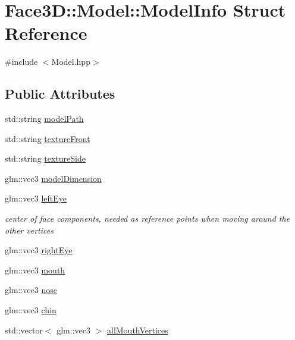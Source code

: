 \hypertarget{struct_face3_d_1_1_model_1_1_model_info}{}\section{Face3D\+:\+:Model\+:\+:Model\+Info Struct Reference}
\label{struct_face3_d_1_1_model_1_1_model_info}


{\ttfamily \#include $<$Model.\+hpp$>$}

\subsection*{Public Attributes}
\begin{DoxyCompactItemize}
\item 
std\+::string \hyperlink{struct_face3_d_1_1_model_1_1_model_info_a7f6cacf9ae39c86e2007f87dacff16e3}{model\+Path}
\item 
std\+::string \hyperlink{struct_face3_d_1_1_model_1_1_model_info_aa31a18f8553efbb08c1e06bbce4785d7}{texture\+Front}
\item 
std\+::string \hyperlink{struct_face3_d_1_1_model_1_1_model_info_a0afbed21c950938c52f4a02da26cfb75}{texture\+Side}
\item 
glm\+::vec3 \hyperlink{struct_face3_d_1_1_model_1_1_model_info_a4e2b64e11591be649d15eca8c6180376}{model\+Dimension}
\item 
glm\+::vec3 \hyperlink{struct_face3_d_1_1_model_1_1_model_info_a8c085a7458ad7cadd13c64a632faa837}{left\+Eye}
\begin{DoxyCompactList}\small\item\em center of face components, needed as reference points when moving around the other vertices \end{DoxyCompactList}\item 
glm\+::vec3 \hyperlink{struct_face3_d_1_1_model_1_1_model_info_acc12c6496e68aa15bcdf996f9bb3b58f}{right\+Eye}
\item 
glm\+::vec3 \hyperlink{struct_face3_d_1_1_model_1_1_model_info_ae0837733aacbb7d04ce34b2f240abf4f}{mouth}
\item 
glm\+::vec3 \hyperlink{struct_face3_d_1_1_model_1_1_model_info_afeddc5304d7cb7c77d3239efeef56747}{nose}
\item 
glm\+::vec3 \hyperlink{struct_face3_d_1_1_model_1_1_model_info_a1f6688ce6effce5f529d8b4f3019766e}{chin}
\item 
std\+::vector$<$ glm\+::vec3 $>$ \hyperlink{struct_face3_d_1_1_model_1_1_model_info_a31db594ca5e11d12cb5965c5a6e3ee2d}{all\+Mouth\+Vertices}

\end{DoxyCompactItemize}
